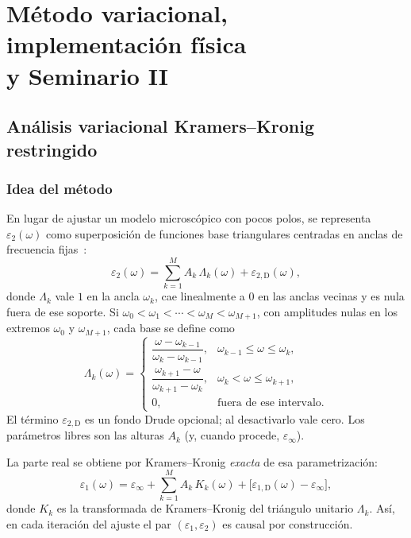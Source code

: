 \part{\texorpdfstring{M\'etodo variacional, implementaci\'on f\'isica\\y Seminario II}{Metodo variacional, implementacion fisica: Seminario II}}

\chapter{An\'alisis variacional Kramers--Kronig restringido}
\label{ch:variacional}

\section{Idea del m\'etodo}

En lugar de ajustar un modelo microsc\'opico con pocos polos, se representa $\varepsilon_2(\omega)$ como superposici\'on de funciones base triangulares centradas en anclas de frecuencia fijas~\cite{constrained}:
\begin{equation}
\label{eq:eps2-tri}
\varepsilon_2(\omega)=\sum_{k=1}^{M}A_k\,\Lambda_k(\omega)
+\varepsilon_{2,\mathrm{D}}(\omega),
\end{equation}
donde $\Lambda_k$ vale $1$ en la ancla $\omega_k$, cae linealmente a $0$ en las anclas vecinas y es nula fuera de ese soporte. Si $\omega_0<\omega_1<\cdots<\omega_M<\omega_{M+1}$, con amplitudes nulas en los extremos $\omega_0$ y $\omega_{M+1}$, cada base se define como
\begin{equation}
\Lambda_k(\omega)=
\begin{cases}
\dfrac{\omega-\omega_{k-1}}{\omega_k-\omega_{k-1}},&\omega_{k-1}\le\omega\le\omega_k,\\[6pt]
\dfrac{\omega_{k+1}-\omega}{\omega_{k+1}-\omega_k},&\omega_k<\omega\le\omega_{k+1},\\[6pt]
0,&\text{fuera de ese intervalo.}
\end{cases}
\end{equation}
El t\'ermino $\varepsilon_{2,\mathrm{D}}$ es un fondo Drude opcional; al desactivarlo vale cero.
Los par\'ametros libres son las alturas $A_k$ (y, cuando procede, $\varepsilon_\infty$).

La parte real se obtiene por Kramers--Kronig \emph{exacta} de esa parametrizaci\'on:
\begin{equation}
\label{eq:eps1-tri}
\varepsilon_1(\omega)
=\varepsilon_\infty
+\sum_{k=1}^{M}A_k\,K_k(\omega)
+\bigl[\varepsilon_{1,\mathrm{D}}(\omega)-\varepsilon_\infty\bigr],
\end{equation}
donde $K_k$ es la transformada de Kramers--Kronig del tri\'angulo unitario $\Lambda_k$.
As\'i, en cada iteraci\'on del ajuste el par $(\varepsilon_1,\varepsilon_2)$ es causal por construcci\'on.

